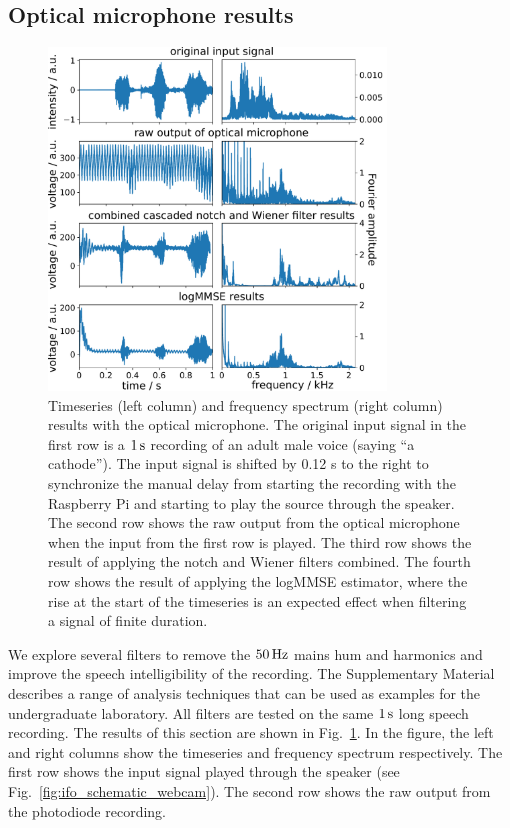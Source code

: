 \documentclass[paper-main.tex]{subfiles}
\begin{document}
\subsection{Optical microphone results}
\label{sec:opticalMicResults}

\begin{figure}
\begin{center}
\includegraphics[width=0.8\textwidth]{figures/combined_highlight_results_melatos_labelled.pdf}
\caption{\label{fig:notchWienerLogMMSEResults}
Timeseries (left column) and frequency spectrum (right column) results with the optical microphone. 
The original input signal in the first row is a $1\,{\rm s}$ recording of an adult male voice (saying ``a cathode''). 
 The input signal is shifted by 0.12 s to the right to synchronize the manual delay from starting the recording with the Raspberry Pi and starting to play the source through the speaker. 
The second row shows the raw output from the optical microphone when the input from the first row is played. 
The third row shows the result of applying the notch and Wiener filters combined. 
The fourth row shows the result of applying the logMMSE estimator, where the rise at the start of the timeseries is an expected effect when filtering a signal of finite duration. 
}
\end{center}
\end{figure}

We explore several filters to remove the $50\,{\rm Hz}$ mains hum and harmonics and improve the speech intelligibility of the recording.
The Supplementary Material describes a range of analysis techniques that can be used as examples for the undergraduate laboratory. 
All filters are tested on the same $1\,{\rm s}$ long speech recording.
The results of this section are shown in Fig.~\ref{fig:notchWienerLogMMSEResults}. 
In the figure, the left and right columns show the timeseries and frequency spectrum respectively. 
The first row shows the input signal played through the speaker (see Fig.~\ref{fig:ifo_schematic_webcam}). 
The second row shows the raw output from the photodiode recording. 
\end{document}
